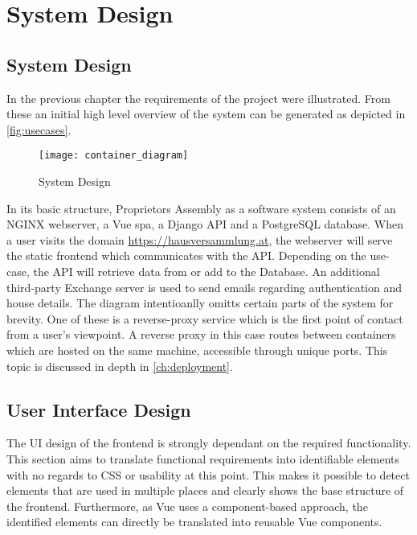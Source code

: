 \chapter[System Design]{System Design}

\section{System Design}
In the previous chapter the requirements of the project were illustrated. From these an initial high level overview of the system can be generated as depicted in \autoref{fig:usecases}.


\begin{figure}[H]
    \begin{center}
    \texttt{[image: container\_diagram]}
    \end{center}
    \caption{System Design}
    \label{fig:usecases}
\end{figure}

In its basic structure, Proprietors Assembly as a software system consists of an NGINX webserver, a Vue \acrlong{spa}, a Django API and a PostgreSQL database. When a user visits the domain \url{https://hausversammlung.at}, the webserver will serve the static frontend which communicates with the API. Depending on the use-case, the API will retrieve data from or add to the Database. An additional third-party Exchange server is used to send emails regarding authentication and house details. The diagram intentioanlly omitts certain parts of the system for brevity. One of these is a reverse-proxy service which is the first point of contact from a user's viewpoint. A reverse proxy in this case routes between containers which are hosted on the same machine, accessible through unique ports. This topic is discussed in depth in \autoref{ch:deployment}.

\section{User Interface Design}
The UI design of the frontend is strongly dependant on the required functionality. This section aims to translate functional requirements into identifiable elements with no regards to CSS or usability at this point. This makes it possible to detect elements that are used in multiple places and clearly shows the base structure of the frontend. Furthermore, as Vue uses a component-based approach, the identified elements can directly be translated into reusable Vue components.

